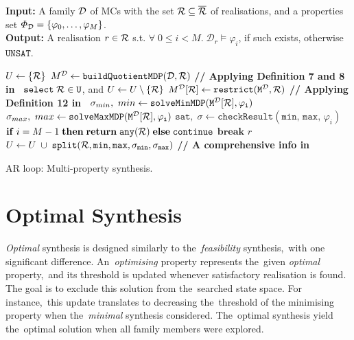 \begin{algorithm}[h!]
\hspace*{\algorithmicindent} \textbf{Input:} A family $\mathcal{D}$ of MCs with the set $\mathcal{R} \subseteq \overline{\mathcal{R}}$ of realisations, and a properties set $\varPhi_{\mathcal{D}} = \{\varphi_0, \dots, \varphi_M \}$. \\
\hspace*{\algorithmicindent} \textbf{Output:}  A realisation $r \in \mathcal{R}$ s.t. $\forall \; 0 \leq i < M. \; \mathcal{D}_r \models \varphi_i$, if such exists, otherwise $\mathtt{UNSAT}$. \\
\vspace*{-1.5em}
\begin{algorithmic}[1]
    \STATE $U \leftarrow \{ \mathcal{R} \}$
    \STATE $M^{\mathcal{D}} \leftarrow \mathtt{buildQuotientMDP(\mathcal{D}, \mathcal{R})}$ \hfill \textbf{// Applying Definition 7 and 8 in~\cite{cegar}}
        \STATE $\mathtt{select \; \mathcal{R} \in U}$, and $U \leftarrow U \setminus \{ \mathcal{R} \}$
        \STATE $M^{\mathcal{D}}[\mathcal{R}] \leftarrow \mathtt{restrict(M^{\mathcal{D}}, \mathcal{R})}$ \hfill \textbf{// Applying Definition 12 in~\cite{cegar}}
            \STATE $\sigma_{min}, \ min \leftarrow \mathtt{solveMinMDP(M^{\mathcal{D}}[\mathcal{R}], \varphi_{i})}$
            \STATE $\sigma_{max}, \ max \leftarrow \mathtt{solveMaxMDP(M^{\mathcal{D}}[\mathcal{R}], \varphi_{i})}$
            \STATE $\mathtt{sat}, \; \sigma \leftarrow \mathtt{checkResult}(\mathtt{min}, \, \mathtt{max}, \, \varphi_i)$
                \STATE $\mathbf{if} \; i = M-1 \; \mathbf{then} \; \mathbf{return} \; \mathtt{any(\mathcal{R})} \; \mathbf{else} \; \mathtt{continue}$
            \ENDIF
                \STATE $\mathbf{break}$
            \ENDIF
                \RETURN $r$
            \ENDIF
            \STATE $U \leftarrow U \; \cup \; \mathtt{split(\mathcal{R}, min, max, \sigma_{min}, \sigma_{max})}$ \hfill \textbf{// A comprehensive info in~\cite{cegar}} 
        \ENDFOR
    \ENDWHILE
\end{algorithmic}
\caption{AR loop: Multi-property synthesis.}
\label{alg:ar_multi}
\end{algorithm}

\section{Optimal Synthesis}
\textit{Optimal} synthesis is designed similarly to the~\textit{feasibility} synthesis,~with one significant difference.
An~\textit{optimising} property represents the~given \textit{optimal} property,~and its threshold is updated whenever satisfactory realisation is found.
The goal is to exclude this solution from the~searched state space.
For instance,~this update translates to decreasing the~threshold of the minimising property when the~\textit{minimal} synthesis considered.
The~optimal synthesis yield the~optimal solution when all family members were explored.

